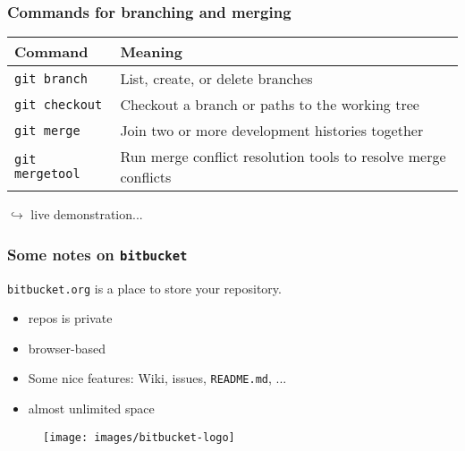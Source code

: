 \documentclass{beamer}
\begin{document}
\begin{frame}
\frametitle{Commands for branching and merging}
\begin{table}
\begin{tabularx}{\textwidth}{l|X}
Command & Meaning \\
 \hline
 \texttt{git branch} & List, create, or delete branches\\
 \texttt{git checkout} & Checkout a branch or paths to the working tree\\
 \texttt{git merge} & Join two or more development histories together\\
 \texttt{git mergetool} & Run merge conflict resolution tools to resolve merge conflicts\\
\end{tabularx}
\end{table}
\hfill $\hookrightarrow$ live demonstration...
\end{frame}

\begin{frame}
 \frametitle{Some notes on \texttt{bitbucket}}
 \vspace{1.5cm}
 \texttt{bitbucket.org} is a place to store your repository.
 \begin{itemize}
  \item repos is {\color{red}private}
  \item browser-based
  \item Some nice features: Wiki, issues, \texttt{README.md}, ...
  \item almost unlimited space
 \end{itemize}
\begin{figure}
\hfill \texttt{[image: images/bitbucket-logo]}
\end{figure}
\end{frame}
\end{document}
